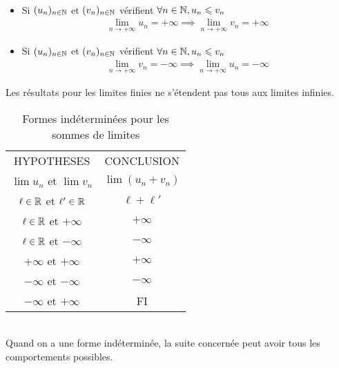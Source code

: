 \begin{graybox}
\begin{theoreme}~ 
    \begin{itemize}
        \item Si $(u_n)_{n \in \mathbb{N}}$ et $(v_n)_{n \in \mathbb{N}}$ vérifient $\forall n \in \mathbb{N}, u_n \leqslant v_n$ 
            \begin{align*}
                \lim_{n \to +\infty} u_n = +\infty \implies \lim_{n \to +\infty} v_n = +\infty
            \end{align*}
        \item Si $(u_n)_{n \in \mathbb{N}}$ et $(v_n)_{n \in \mathbb{N}}$ vérifient $\forall n \in \mathbb{N}, u_n \leqslant v_n$
            \begin{align*}
                \lim_{n \to +\infty} v_n = -\infty \implies \lim_{n \to +\infty} u_n = -\infty
            \end{align*}
    \end{itemize}
\end{theoreme}
\end{graybox}
\begin{remarque}
Les résultats pour les limites finies ne s'étendent pas tous aux limites infinies.
\begin{table}[!h]
\centering
\begin{tabular}{c c}
HYPOTHESES & CONCLUSION \\
$\lim u_n$ et  $\lim v_n$ & $\lim (u_n + v_n)$ \\
$\ell \in \mathbb{R}$ et $\ell ' \in \mathbb{R}$ & $\ell + \ell'$ \\
$\ell \in \mathbb{R}$ et $+\infty$ & $+\infty$ \\
$\ell \in \mathbb{R}$ et $-\infty$ & $-\infty$ \\
$+\infty$ et $+\infty$ & $+\infty$ \\
$-\infty$ et $-\infty$ & $-\infty$ \\
$-\infty$ et $+\infty$ & FI
\end{tabular}
\caption{Formes indéterminées pour les sommes de limites}
\end{table}
\\
Quand on a une forme indéterminée, la suite concernée peut avoir tous les comportements possibles.
\end{remarque}

